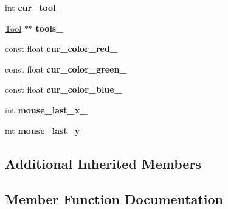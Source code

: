 \begin{DoxyCompactItemize}
\item 
int {\bfseries cur\+\_\+tool\+\_\+}\hypertarget{classimage__tools_1_1MIAApp_a5f86ffd9e81a59a12ff54bb7641addda}{}\label{classimage__tools_1_1MIAApp_a5f86ffd9e81a59a12ff54bb7641addda}

\item 
\hyperlink{classimage__tools_1_1Tool}{Tool} $\ast$$\ast$ {\bfseries tools\+\_\+}\hypertarget{classimage__tools_1_1MIAApp_a31085c967b25f06fbfdcd775b7932cdf}{}\label{classimage__tools_1_1MIAApp_a31085c967b25f06fbfdcd775b7932cdf}

\item 
const float {\bfseries cur\+\_\+color\+\_\+red\+\_\+}\hypertarget{classimage__tools_1_1MIAApp_a4646e4c77f4e76627c11374bf32713a2}{}\label{classimage__tools_1_1MIAApp_a4646e4c77f4e76627c11374bf32713a2}

\item 
const float {\bfseries cur\+\_\+color\+\_\+green\+\_\+}\hypertarget{classimage__tools_1_1MIAApp_ae55b0d91642e158590272ebc2d85fce3}{}\label{classimage__tools_1_1MIAApp_ae55b0d91642e158590272ebc2d85fce3}

\item 
const float {\bfseries cur\+\_\+color\+\_\+blue\+\_\+}\hypertarget{classimage__tools_1_1MIAApp_a4971bada2c531e33f4257315c2119c5e}{}\label{classimage__tools_1_1MIAApp_a4971bada2c531e33f4257315c2119c5e}

\item 
int {\bfseries mouse\+\_\+last\+\_\+x\+\_\+}\hypertarget{classimage__tools_1_1MIAApp_ac7e6ec4d27cc372cfb39f4f557d2426d}{}\label{classimage__tools_1_1MIAApp_ac7e6ec4d27cc372cfb39f4f557d2426d}

\item 
int {\bfseries mouse\+\_\+last\+\_\+y\+\_\+}\hypertarget{classimage__tools_1_1MIAApp_a11890db1739569d14da6172745ec38a0}{}\label{classimage__tools_1_1MIAApp_a11890db1739569d14da6172745ec38a0}

\end{DoxyCompactItemize}
\subsection*{Additional Inherited Members}


\subsection{Member Function Documentation}
